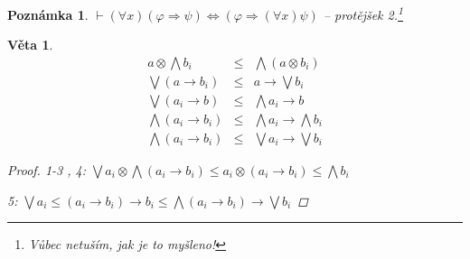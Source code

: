 \documentclass[10pt, a4paper, titlepage]{article}
\theoremstyle{note}
\newtheorem{veta}{Věta}
\newtheorem{poznamka}{Poznámka}
\begin{document}
\begin{poznamka}
$\vdash (\forall x)(\varphi\Rightarrow\psi)\Leftrightarrow(\varphi\Rightarrow(\forall x)\psi)$ -- protějšek 2.\footnote{Vůbec netuším, jak je to myšleno!}
\end{poznamka}
\begin{veta}
\begin{eqnarray}
a\otimes \bigwedge b_{i}&\leq&\bigwedge(a\otimes b_{i})\nonumber\\
\bigvee(a\rightarrow b_{i})&\leq& a\rightarrow \bigvee b_{i}\nonumber\\
\bigvee(a_{i}\rightarrow b)&\leq& \bigwedge a_{i}\rightarrow b\nonumber\\
\bigwedge(a_{i}\rightarrow b_{i})&\leq&\bigwedge a_{i}\rightarrow\bigwedge b_{i}\nonumber\\
\bigwedge(a_{i}\rightarrow b_{i})&\leq&\bigvee a_{i}\rightarrow \bigvee b_{i}\nonumber
\end{eqnarray}
\begin{proof}
1-3 , 4: $\bigvee a_{i} \otimes \bigwedge(a_{i}\rightarrow b_{i})\leq a_{i}\otimes(a_{i}\rightarrow b_{i})\leq \bigwedge b_{i}$

5: $\bigvee a_{i}\leq(a_{i}\rightarrow b_{i})\rightarrow b_{i}\leq \bigwedge(a_{i}\rightarrow b_{i})\rightarrow\bigvee b_{i}$
\end{proof}
\end{veta}
\renewcommand{\indexcolumns}{3}
\printindex
\end{document}
